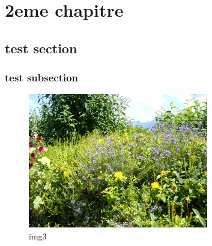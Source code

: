 \documentclass[a4paper,10pt,openany,oneside]{report}
\begin{document}
\chapter{2eme chapitre}

\section{test section}

\subsection{test subsection}

\begin{figure}[ht]
	\centering
	\vspace*{1cm}
	\includegraphics[width=0.7\textwidth]{img/img3.jpg}
	\caption{\label{}img3}
\end{figure}
\end{document}
